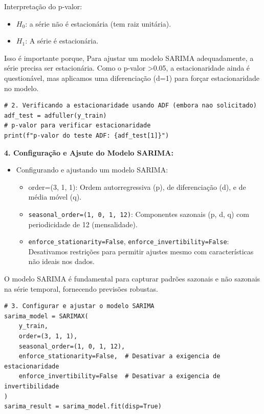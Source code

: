 \documentclass[a4paper, 12pt]{article}
\begin{document}
Interpretação do p-valor:
\begin{itemize}
    \item $H_0$: a série não é estacionária (tem raiz unitária).
    \item $H_1$: A série é estacionária.
\end{itemize}

Isso é importante porque, Para ajustar um modelo SARIMA adequadamente, a série precisa ser estacionária. Como o p-valor >0.05, a estacionaridade ainda é questionável, mas aplicamos uma diferenciação (d=1) para forçar estacionaridade no modelo.

\begin{lstlisting}[style=python]
    # 2. Verificando a estacionaridade usando ADF (embora nao solicitado)
adf_test = adfuller(y_train)
# p-valor para verificar estacionaridade
print(f"p-valor do teste ADF: {adf_test[1]}")
\end{lstlisting}

\textbf{4. Configuração e Ajsute do Modelo SARIMA:}
\begin{itemize}
    \item Configurando e ajustando um modelo SARIMA:
    \begin{itemize}
        \item order=(3, 1, 1): Ordem autorregressiva (p), de diferenciação (d), e de média móvel (q).
        \item \texttt{seasonal\_order=(1, 0, 1, 12)}: Componentes sazonais (p, d, q) com periodicidade de 12 (mensalidade).
        \item \texttt{enforce\_stationarity=False}, \texttt{enforce\_invertibility=False}: Desativamos restrições para permitir ajustes mesmo com características não ideais nos dados.
    \end{itemize}
\end{itemize}

O modelo SARIMA é fundamental para capturar padrões sazonais e não sazonais na série temporal, fornecendo previsões robustas.

\begin{lstlisting}[style=python]
# 3. Configurar e ajustar o modelo SARIMA
sarima_model = SARIMAX(
    y_train,
    order=(3, 1, 1),
    seasonal_order=(1, 0, 1, 12),
    enforce_stationarity=False,  # Desativar a exigencia de estacionaridade
    enforce_invertibility=False  # Desativar a exigencia de invertibilidade
)
sarima_result = sarima_model.fit(disp=True)
\end{lstlisting}
\end{document}
